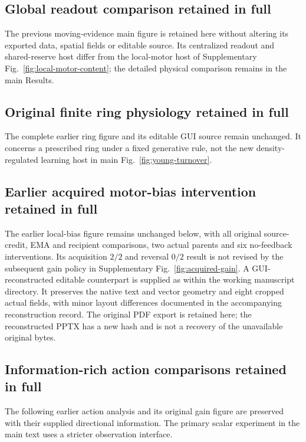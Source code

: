 \subsection*{Global readout comparison retained in full}
The previous moving-evidence main figure is retained here without altering its exported data, spatial fields or editable source. Its centralized readout and shared-reserve host differ from the local-motor host of Supplementary Fig.~\ref{fig:local-motor-content}; the detailed physical comparison remains in the main Results.




\subsection*{Original finite ring physiology retained in full}
The complete earlier ring figure and its editable GUI source remain unchanged. It concerns a prescribed ring under a fixed generative rule, not the new density-regulated learning host in main Fig.~\ref{fig:young-turnover}.



\subsection*{Earlier acquired motor-bias intervention retained in full}
The earlier local-bias figure remains unchanged below, with all original source-credit, EMA and recipient comparisons, two actual parents and six no-feedback interventions. Its acquisition $2/2$ and reversal $0/2$ result is not revised by the subsequent gain policy in Supplementary Fig.~\ref{fig:acquired-gain}. A GUI-reconstructed editable counterpart is supplied as  within the working manuscript directory. It preserves the native text and vector geometry and eight cropped actual fields, with minor layout differences documented in the accompanying reconstruction record. The original PDF export is retained here; the reconstructed PPTX has a new hash and is not a recovery of the unavailable original bytes.



\subsection*{Information-rich action comparisons retained in full}\label{supp:information-rich-action}
The following earlier action analysis and its original gain figure are preserved with their supplied directional information. The primary scalar experiment in the main text uses a stricter observation interface.

